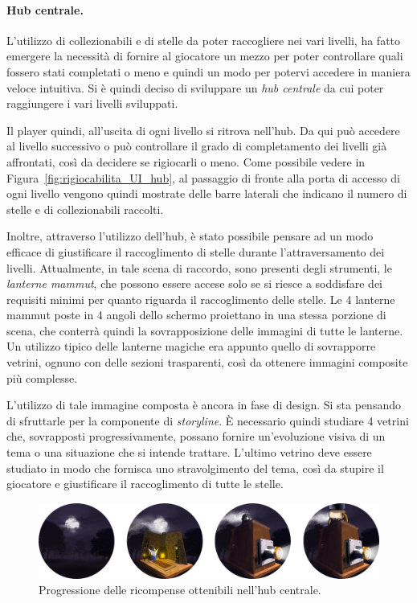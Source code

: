 \paragraph{Hub centrale.}
\label{par:hub_centrale}
L’utilizzo di collezionabili e di stelle da poter raccogliere nei vari livelli, ha fatto emergere la necessità di fornire al giocatore un mezzo per poter controllare quali fossero stati completati o meno e quindi un modo per potervi accedere in maniera veloce intuitiva.
Si è quindi deciso di sviluppare un \textit{hub centrale} da cui poter raggiungere i vari livelli sviluppati.

Il player quindi, all’uscita di ogni livello si ritrova nell’hub. Da qui può accedere al livello successivo o può controllare il grado di completamento dei livelli già affrontati, così da decidere se rigiocarli o meno.
Come possibile vedere in Figura~\ref{fig:rigiocabilita_UI_hub}, al passaggio di fronte alla porta di accesso di ogni livello vengono quindi mostrate delle barre laterali che indicano il numero di stelle e di collezionabili raccolti.

Inoltre, attraverso l’utilizzo dell’hub, è stato possibile pensare ad un modo efficace di giustificare il raccoglimento di stelle durante l’attraversamento dei livelli.
Attualmente, in tale scena di raccordo, sono presenti degli strumenti, le \textit{lanterne mammut}, che possono essere accese solo se si riesce a soddisfare dei requisiti minimi per quanto riguarda il raccoglimento delle stelle.
Le 4 lanterne mammut poste in 4 angoli dello schermo proiettano in una stessa porzione di scena, che conterrà quindi la sovrapposizione delle immagini di tutte le lanterne. Un utilizzo tipico delle lanterne magiche era appunto quello di sovrapporre vetrini, ognuno con delle sezioni trasparenti, così da ottenere immagini composite più complesse.

L’utilizzo di tale immagine composta è ancora in fase di design. Si sta pensando di sfruttarle per la componente di \textit{storyline}. È necessario quindi studiare 4 vetrini che, sovrapposti progressivamente, possano fornire un’evoluzione visiva di un tema o una situazione che si intende trattare.
L’ultimo vetrino deve essere studiato in modo che fornisca uno stravolgimento del tema, così da stupire il giocatore e giustificare il raccoglimento di tutte le stelle.

\begin{figure}%
	\centering
	\includegraphics[width= \columnwidth]{images/gameDesign/40_premi.jpg}
	\caption{Progressione delle ricompense ottenibili nell'hub centrale.}
	\label{fig:level_design_ricompense}
\end{figure}

